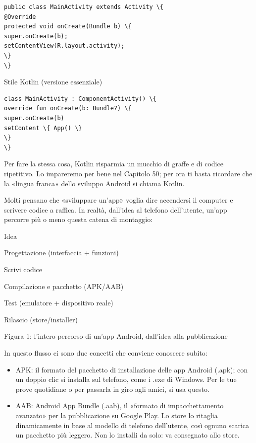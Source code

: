 \begin{lstlisting}
public class MainActivity extends Activity \{
@Override
protected void onCreate(Bundle b) \{
super.onCreate(b);
setContentView(R.layout.activity);
\}
\}
\end{lstlisting}

Stile Kotlin (versione essenziale)

\begin{lstlisting}
class MainActivity : ComponentActivity() \{
override fun onCreate(b: Bundle?) \{
super.onCreate(b)
setContent \{ App() \}
\}
\}
\end{lstlisting}

Per fare la stessa cosa, Kotlin risparmia un mucchio di graffe e di codice ripetitivo. Lo impareremo per bene nel Capitolo 50; per ora ti basta ricordare che la «lingua franca» dello sviluppo Android si chiama Kotlin.


Molti pensano che «sviluppare un'app» voglia dire accendersi il computer e scrivere codice a raffica. In realtà, dall'idea al telefono dell'utente, un'app percorre più o meno questa catena di montaggio:

Idea

Progettazione (interfaccia + funzioni)

Scrivi codice

Compilazione e pacchetto (APK/AAB)

Test (emulatore + dispositivo reale)

Rilascio (store/installer)

\begin{center}\small\color{gray}Figura 1: l'intero percorso di un'app Android, dall'idea alla pubblicazione\end{center}

In questo flusso ci sono due concetti che conviene conoscere subito:

\begin{itemize}
  \item APK: il formato del pacchetto di installazione delle app Android (.apk); con un doppio clic si installa sul telefono, come i .exe di Windows. Per le tue prove quotidiane o per passarla in giro agli amici, si usa questo.
  \item AAB: Android App Bundle (.aab), il «formato di impacchettamento avanzato» per la pubblicazione su Google Play. Lo store lo ritaglia dinamicamente in base al modello di telefono dell'utente, così ognuno scarica un pacchetto più leggero. Non lo installi da solo: va consegnato allo store.
\end{itemize}

